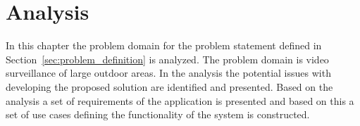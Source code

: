\chapter{Analysis}
In this chapter the problem domain for the problem statement defined in Section~\ref{sec:problem_definition} is analyzed.
The problem domain is video surveillance of large outdoor areas.
In the analysis the potential issues with developing the proposed solution are identified and presented.
Based on the analysis a set of requirements of the application is presented and based on this a set of use cases defining the functionality of the system is constructed.





